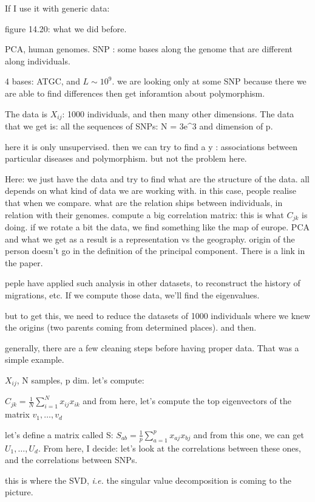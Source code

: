 \documentclass[a4paper]{tufte-book}
\newcommand{\hairsp}{\hspace{1pt}}%
\newcommand{\ie}{\textit{i.\hairsp{}e.}\xspace}
\newcommand{\nth}{\frac{1}{N}}
\newcommand{\sumin}{\sum_{i=1}^N}
\begin{document}
If I use it with generic data:

figure 14.20: what we did before.

PCA, human genomes.
SNP : some bases along the genome that are different along individuals.

4 bases: ATGC, and $L\sim 10^9$. we are looking only at some SNP because there
we are able to find differences
then get inforamtion about polymorphism.

The data is $X_{ij}$: 1000 individuals, and then many other dimensions.
The data that we get is:
all the sequences of SNPs: N = 3e^3 and dimension of p.

here it is only unsupervised.
then we can try to find a y : associations between particular diseases and
polymorphism. but not the problem here.

Here: we just have the data and try to find what are the structure of the data.
all depends on what kind of data we are working with.
in this case, people realise that when we compare. what are the relation ships
between individuals, in relation with their genomes.
compute a big correlation matrix: this is what $C_{jk}$ is doing.
if we rotate a bit the data, we find something like the map of europe.
PCA and what we get as a result is a representation vs the geography.
origin of the person doesn't go in the definition of the principal component.
There is a link in the paper.

peple have applied such analysis in other datasets, to reconstruct the history
of migrations, etc. If we compute those data, we'll find the eigenvalues.

but to get this, we need to reduce the datasets of 1000 individuals where we
knew the origins (two parents coming from determined places).
and then.

generally, there are a few cleaning steps before having proper data.
That was a simple example.

$X_{ij}$, N samples, p dim.
let's compute:

$C_{jk} = \nth \sumin x_{ij}x_{ik}$
and from here, let's compute the top eigenvectors of the matrix
$v_1,\ldots,v_d$

let's define a matrix called S:
$S_{ab} = \frac{1}{p} \sum_{a=1}^p x_{aj} x_{bj}$ and from this one, we can get
$U_1, \ldots, U_d$.
From here, I decide: let's look at the correlations between these ones, and the
correlations between SNPs.

this is where the SVD, \ie the singular value decomposition is coming to the picture.
\end{document}
